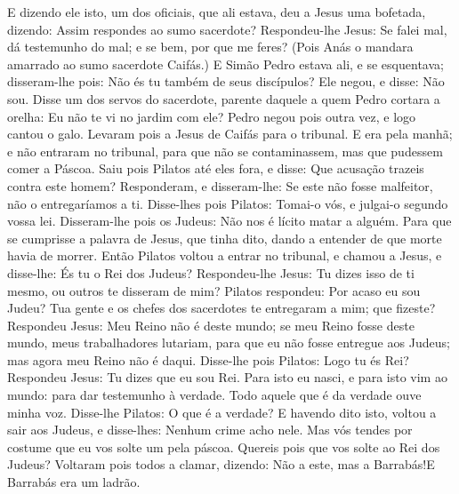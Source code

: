 {E dizendo ele isto, um dos oficiais, que ali estava, deu a Jesus uma bofetada, dizendo: Assim respondes ao sumo sacerdote?
Respondeu-lhe Jesus: Se falei mal, dá testemunho do mal; e se bem, por que me feres?
(Pois Anás o mandara amarrado ao sumo sacerdote Caifás.)
E Simão Pedro estava ali, e se esquentava; disseram-lhe pois: Não és tu também de seus discípulos? Ele negou, e disse: Não sou.
Disse um dos servos do sacerdote, parente daquele a quem Pedro cortara a orelha: Eu não te vi no jardim com ele?
Pedro negou pois outra vez, e logo cantou o galo.
Levaram pois a Jesus de Caifás para o tribunal. E era pela manhã; e não entraram no tribunal, para que não se contaminassem, mas que pudessem comer a Páscoa.
Saiu pois Pilatos até eles fora, e disse: Que acusação trazeis contra este homem?
Responderam, e disseram-lhe: Se este não fosse malfeitor, não o entregaríamos a ti.
Disse-lhes pois Pilatos: Tomai-o vós, e julgai-o segundo vossa lei. Disseram-lhe pois os Judeus: Não nos é lícito matar a alguém.
Para que se cumprisse a palavra de Jesus, que tinha dito, dando a entender de que morte havia de morrer.
Então Pilatos voltou a entrar no tribunal, e chamou a Jesus, e disse-lhe: És tu o Rei dos Judeus?
Respondeu-lhe Jesus: Tu dizes isso de ti mesmo, ou outros te disseram de mim?
Pilatos respondeu: Por acaso eu sou Judeu? Tua gente e os chefes dos sacerdotes te entregaram a mim; que fizeste?
Respondeu Jesus: Meu Reino não é deste mundo; se meu Reino fosse deste mundo, meus trabalhadores lutariam, para que eu não fosse entregue aos Judeus; mas agora meu Reino não é daqui.
Disse-lhe pois Pilatos: Logo tu és Rei? Respondeu Jesus: Tu dizes que eu sou Rei. Para isto eu nasci, e para isto vim ao mundo: para dar testemunho à verdade. Todo aquele que é da verdade ouve minha voz.
Disse-lhe Pilatos: O que é a verdade? E havendo dito isto, voltou a sair aos Judeus, e disse-lhes: Nenhum crime acho nele.
Mas vós tendes por costume que eu vos solte um pela páscoa. Quereis pois que vos solte ao Rei dos Judeus?
Voltaram pois todos a clamar, dizendo: Não a este, mas a Barrabás!E Barrabás era um ladrão.

}
